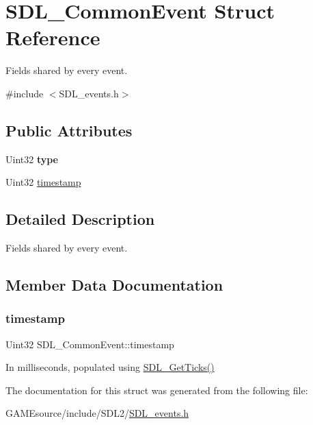 \hypertarget{struct_s_d_l___common_event}{}\section{S\+D\+L\+\_\+\+Common\+Event Struct Reference}
\label{struct_s_d_l___common_event}


Fields shared by every event.  




{\ttfamily \#include $<$S\+D\+L\+\_\+events.\+h$>$}

\subsection*{Public Attributes}
\begin{DoxyCompactItemize}
\item 
\mbox{\label{struct_s_d_l___common_event_a4ecd888325355321b42b2e2956f27453}} 
Uint32 {\bfseries type}
\item 
Uint32 \mbox{\hyperlink{struct_s_d_l___common_event_a7d9046abb021ffc88dd5d32978289e65}{timestamp}}
\end{DoxyCompactItemize}


\subsection{Detailed Description}
Fields shared by every event. 

\subsection{Member Data Documentation}
\mbox{\label{struct_s_d_l___common_event_a7d9046abb021ffc88dd5d32978289e65}} 
\subsubsection{\texorpdfstring{timestamp}{timestamp}}
{\footnotesize\ttfamily Uint32 S\+D\+L\+\_\+\+Common\+Event\+::timestamp}

In milliseconds, populated using \mbox{\hyperlink{_s_d_l__timer_8h_a0b9bc71d6287e0ffafdc3419760fe2b3}{S\+D\+L\+\_\+\+Get\+Ticks()}} 

The documentation for this struct was generated from the following file\+:\begin{DoxyCompactItemize}
\item 
G\+A\+M\+Esource/include/\+S\+D\+L2/\mbox{\hyperlink{_s_d_l__events_8h}{S\+D\+L\+\_\+events.\+h}}\end{DoxyCompactItemize}
